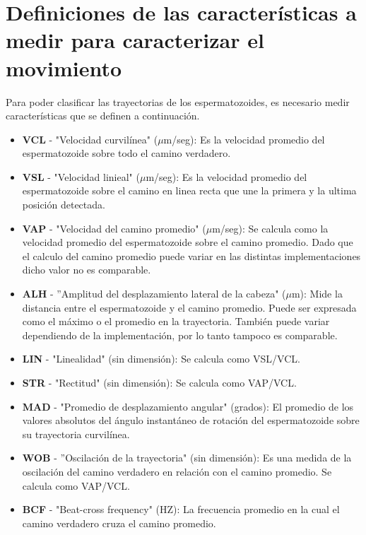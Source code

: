 \chapter{Definiciones de las características a medir para caracterizar el movimiento}
\label{chap:definiciones}

Para poder clasificar las trayectorias de los espermatozoides, es necesario medir características que se definen a continuación.

\begin{itemize}
    \item \textbf{VCL} - "Velocidad curvilínea" ($\mu$m/seg): Es la velocidad promedio del espermatozoide sobre todo el camino verdadero. 
    \item \textbf{VSL} - "Velocidad linieal" ($\mu$m/seg): Es la velocidad promedio del espermatozoide sobre el camino en linea recta que une la primera y la ultima posición detectada.
    \item \textbf{VAP} - "Velocidad del camino promedio" ($\mu$m/seg): Se calcula como la velocidad promedio del espermatozoide sobre el camino promedio. Dado que el calculo del camino promedio puede variar en las distintas implementaciones dicho valor no es comparable.
    \item \textbf{ALH} - ''Amplitud del desplazamiento lateral de la cabeza" ($\mu$m): Mide la distancia entre el espermatozoide y el camino promedio. Puede ser expresada como el máximo o el promedio en la trayectoria. También puede variar dependiendo de la implementación, por lo tanto tampoco es comparable.
    \item \textbf{LIN} - "Linealidad" (sin dimensión): Se calcula como VSL/VCL.
    \item \textbf{STR} - "Rectitud" (sin dimensión): Se calcula como VAP/VCL.
    \item \textbf{MAD} - "Promedio de desplazamiento angular" (grados): El promedio de los valores absolutos del ángulo instantáneo de rotación del espermatozoide sobre su trayectoria curvilínea.
    \item \textbf{WOB} - ''Oscilación de la trayectoria" (sin dimensión): Es una medida de la oscilación del camino verdadero en relación con el camino promedio. Se calcula como VAP/VCL. 
    \item \textbf{BCF} - "Beat-cross frequency" (HZ): La frecuencia promedio en la cual el camino verdadero cruza el camino promedio.
\end{itemize}{}
